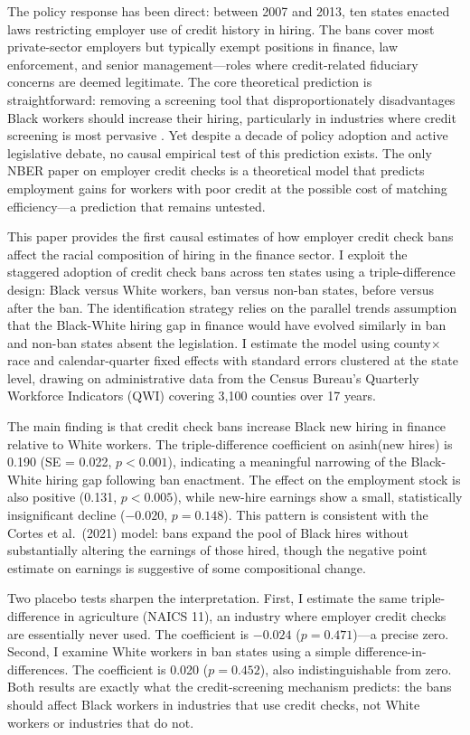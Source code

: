 \documentclass[12pt]{article}
\begin{document}
The policy response has been direct: between 2007 and 2013, ten states enacted laws restricting employer use of credit history in hiring. The bans cover most private-sector employers but typically exempt positions in finance, law enforcement, and senior management---roles where credit-related fiduciary concerns are deemed legitimate. The core theoretical prediction is straightforward: removing a screening tool that disproportionately disadvantages Black workers should increase their hiring, particularly in industries where credit screening is most pervasive \citep{cortes2021employer}. Yet despite a decade of policy adoption and active legislative debate, no causal empirical test of this prediction exists. The only NBER paper on employer credit checks is a theoretical model \citep{cortes2021employer} that predicts employment gains for workers with poor credit at the possible cost of matching efficiency---a prediction that remains untested.

This paper provides the first causal estimates of how employer credit check bans affect the racial composition of hiring in the finance sector. I exploit the staggered adoption of credit check bans across ten states using a triple-difference design: Black versus White workers, ban versus non-ban states, before versus after the ban. The identification strategy relies on the parallel trends assumption that the Black-White hiring gap in finance would have evolved similarly in ban and non-ban states absent the legislation. I estimate the model using county$\times$race and calendar-quarter fixed effects with standard errors clustered at the state level, drawing on administrative data from the Census Bureau's Quarterly Workforce Indicators (QWI) covering 3,100 counties over 17 years.

The main finding is that credit check bans increase Black new hiring in finance relative to White workers. The triple-difference coefficient on asinh(new hires) is 0.190 (SE = 0.022, $p < 0.001$), indicating a meaningful narrowing of the Black-White hiring gap following ban enactment. The effect on the employment stock is also positive (0.131, $p < 0.005$), while new-hire earnings show a small, statistically insignificant decline ($-0.020$, $p = 0.148$). This pattern is consistent with the Cortes et al.\ (2021) model: bans expand the pool of Black hires without substantially altering the earnings of those hired, though the negative point estimate on earnings is suggestive of some compositional change.

Two placebo tests sharpen the interpretation. First, I estimate the same triple-difference in agriculture (NAICS 11), an industry where employer credit checks are essentially never used. The coefficient is $-0.024$ ($p = 0.471$)---a precise zero. Second, I examine White workers in ban states using a simple difference-in-differences. The coefficient is 0.020 ($p = 0.452$), also indistinguishable from zero. Both results are exactly what the credit-screening mechanism predicts: the bans should affect Black workers in industries that use credit checks, not White workers or industries that do not.
\end{document}
